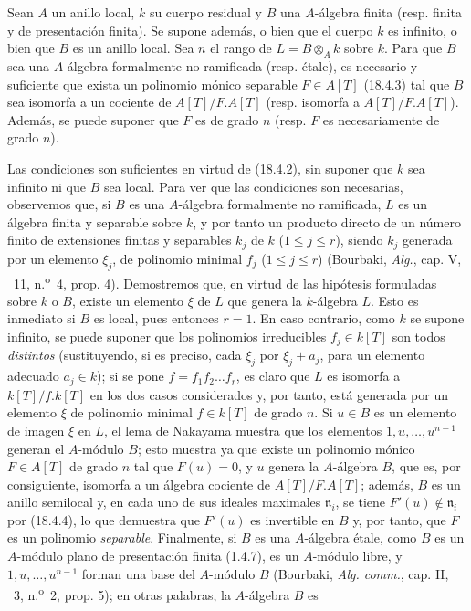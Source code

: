 \begin{proposition}[18.4.5]
\label{IV.18.4.5}
Sean $A$ un anillo local, $k$ su cuerpo residual y $B$ una $A$-álgebra finita \textup{(resp.} finita y de presentación finita\textup{)}. Se supone además, o bien que el cuerpo $k$ es infinito, o bien que $B$ es un anillo local. Sea $n$ el rango de $L=B\otimes_A k$ sobre $k$. Para que $B$ sea una $A$-álgebra formalmente no ramificada \textup{(resp.} étale\textup{)}, es necesario y suficiente que exista un polinomio mónico separable $F\in A[T]$ \textup{(18.4.3)} tal que $B$ sea isomorfa a un cociente de $A[T]/F.A[T]$ \textup{(resp.} isomorfa a $A[T]/F.A[T]$\textup{)}. Además, se puede suponer que $F$ es de grado $n$ \textup{(resp.} $F$ es necesariamente de grado $n$\textup{)}.
\end{proposition}

Las condiciones son suficientes en virtud de (18.4.2), sin suponer que $k$ sea infinito ni que $B$ sea local. Para ver que las condiciones son necesarias, observemos que, si $B$ es una $A$-álgebra formalmente no ramificada, $L$ es un álgebra finita y separable sobre $k$, y por tanto un producto directo de un número finito de extensiones finitas y separables $k_j$ de $k$ ($1\leq j\leq r$), siendo $k_j$ generada por un elemento $\xi_j$, de polinomio minimal $f_j$ ($1\leq j\leq r$) (Bourbaki, \emph{Alg.}, cap. V, \textsection~11, n.\textsuperscript{o}~4, prop. 4). Demostremos que, en virtud de las hipótesis formuladas sobre $k$ o $B$, existe un elemento $\xi$ de $L$ que genera la $k$-álgebra $L$. Esto es inmediato si $B$ es local, pues entonces $r=1$. En caso contrario, como $k$ se supone infinito, se puede suponer que los polinomios irreducibles $f_j\in k[T]$ son todos \emph{distintos} (sustituyendo, si es preciso, cada $\xi_j$ por $\xi_j+a_j$, para un elemento adecuado $a_j\in k$); si se pone $f=f_1f_2\ldots f_r$, es claro que $L$ es isomorfa a $k[T]/f.k[T]$ en los dos casos considerados y, por tanto, está generada por un elemento $\xi$ de polinomio minimal $f\in k[T]$ de grado $n$. Si $u\in B$ es un elemento de imagen $\xi$ en $L$, el lema de Nakayama muestra que los elementos $1,u,\ldots,u^{n-1}$ generan el $A$-módulo $B$; esto muestra ya que existe un polinomio mónico $F\in A[T]$ de grado $n$ tal que $F(u)=0$, y $u$ genera la $A$-álgebra $B$, que es, por consiguiente, isomorfa a un álgebra cociente de $A[T]/F.A[T]$; además, $B$ es un anillo semilocal y, en cada uno de sus ideales maximales $\mathfrak n_i$, se tiene $F'(u)\notin\mathfrak n_i$ por (18.4.4), lo que demuestra que $F'(u)$ es invertible en $B$ y, por tanto, que $F$ es un polinomio \emph{separable}. Finalmente, si $B$ es una $A$-álgebra étale, como $B$ es un $A$-módulo plano de presentación finita (1.4.7), es un $A$-módulo libre, y $1,u,\ldots,u^{n-1}$ forman una base del $A$-módulo $B$ (Bourbaki, \emph{Alg. comm.}, cap. II, \textsection~3, n.\textsuperscript{o}~2, prop. 5); en otras palabras, la $A$-álgebra $B$ es

